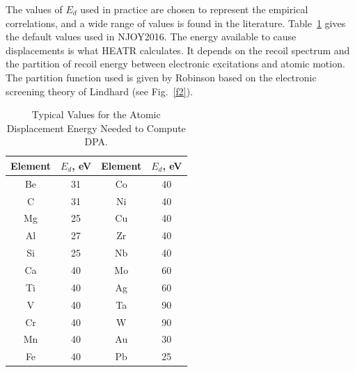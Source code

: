 \noindent
The values of $E_d$ used in practice are chosen to represent the
empirical correlations, and a wide range of values is found in the
literature\cite{Gabriel,Doran,Greenwood}.  Table~\ref{ade} gives
the default values used in NJOY2016.  The energy available to cause
displacements is what HEATR calculates.  It depends on the recoil
spectrum and the partition of recoil energy between electronic
excitations and atomic motion.  The partition function used is
given by Robinson\cite{Robinson} based on the electronic screening
theory of Lindhard\cite{Lindhard} (see Fig.~\ref{f2}).

\begin{table}[t]
\caption[Atomic Displacement Energy Data for DPA]{Typical
  Values for the Atomic Displacement Energy
  Needed to Compute DPA\cite{Greenwood}.}

\begin{center}
\begin{tabular}{cccc}
Element & $E_d$, eV & Element & $E_d$, eV \\ \hline
Be & 31 & Co & 40 \\
C  & 31 & Ni & 40 \\
Mg & 25 & Cu & 40 \\
Al & 27 & Zr & 40 \\
Si & 25 & Nb & 40 \\
Ca & 40 & Mo & 60 \\
Ti & 40 & Ag & 60 \\
V  & 40 & Ta & 90 \\
Cr & 40 & W  & 90 \\
Mn & 40 & Au & 30 \\
Fe & 40 & Pb & 25 \\ \hline
\end{tabular}
\end{center}
\label{ade}
\end{table}

